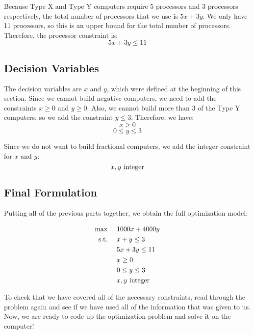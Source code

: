 \documentclass[12pt]{article}
\begin{document}
Because Type X and Type Y computers require 5 processors and 3 processors respectively, the total number of processors
that we use is $5x + 3y$.  We only have 11 processors, so this is an upper bound for the total number of processors.  Therefore,
the processor constraint is:
\[
5x + 3y \leq 11
\]

\subsection{Decision Variables}
The decision variables are $x$ and $y$, which were defined at the beginning of this section.  Since we cannot build
negative computers, we need to add the constraints $x \ge 0$ and $y \ge 0$.  Also, we cannot build more than 3 of the Type Y computers, so we add the constraint $y \leq 3$.  Therefore, we have:
\[
x \geq 0
\]
\[
0 \le y \leq 3
\]

Since we do not want to build fractional computers, we add the integer constraint for $x$ and $y$:
\[
x, y ~\textup{integer}
\]

\subsection{Final Formulation}
Putting all of the previous parts together, we obtain the full optimization model:

\begin{equation}
\label{eq:opt_1}
\begin{array}{rl}
\max~ & 1000x + 4000y \vspace{3pt}\\
\textup{s.t.}~ & x + y \leq 3 \vspace{3pt}\\
& 5x + 3y \leq 11 \vspace{3pt}\\
& x \geq 0 \vspace{3pt}\\
& 0 \le y \leq 3 \vspace{3pt}\\
& x, y ~\textup{integer}\\
\end{array}
\end{equation}

To check that we have covered all of the necessary constraints, read through the problem again and
see if we have used all of the information that was given to us.  Now, we are ready to code up the
optimization problem and solve it on the computer!  
\end{document}
